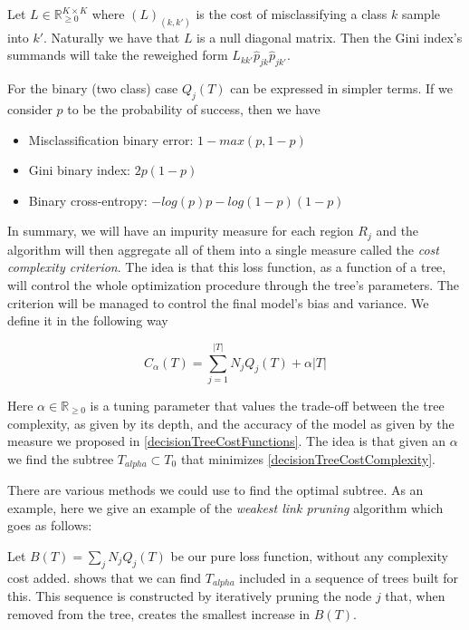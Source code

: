 Let $L \in \mathbb R_{\ge 0}^{K \times K}$ where $(L)_{(k,k')}$ is the cost of misclassifying a class $k$ sample into $k'$. Naturally we have that $L$ is a null diagonal matrix. Then the Gini index's summands will take the reweighed form  $L_{kk'} \hat{p}_{jk} \hat{p}_{jk'}$.

For the binary (two class) case $Q_j(T)$ can be expressed in simpler terms. If we consider $p$ to be the probability of success, then we have

\begin{itemize}
\item Misclassification binary error: $1 - max(p, 1-p)$
\item Gini binary index: $ 2p(1-p) $
\item Binary cross-entropy: $ -log(p)p - log(1- p)(1-p) $
\end{itemize}\label{decisionTreeCostFunctions}

In summary, we will have an impurity measure for each region $R_j$ and the algorithm will then aggregate all of them into a single measure called the \textit{cost complexity criterion}. The idea is that this loss function, as a function of a tree, will control the whole optimization procedure through the tree's parameters. The criterion will be managed to control the final model's bias and variance. We define it in the following way

\begin{equation}
C_\alpha(T)  = \sum_{j=1}^{|T|} N_j Q_j(T)  + \alpha|T|
\end{equation}\label{decisionTreeCostComplexity}


Here  $\alpha \in \mathbb{R}_{\geq 0}$ is a tuning parameter that values the trade-off between the tree complexity, as given by its depth, and the accuracy of the model as given by the measure we proposed in \ref{decisionTreeCostFunctions}. The idea is that given an $\alpha$ we find the subtree $T_{alpha} \subset T_0$ that minimizes \ref{decisionTreeCostComplexity}.

There are various methods we could use to find the optimal subtree. As an example, here we give an example of the \textit{weakest link pruning} algorithm which goes as follows:

Let  $B(T)  = \sum_{j} N_j Q_j(T) $ be our pure loss function, without any complexity cost added. \textcite{breiman-cart84} shows that we can find $T_{alpha}$ included in a sequence of trees built for this. This sequence is constructed by iteratively pruning the node $j$ that, when removed from the tree, creates the smallest increase in $B(T)$.

